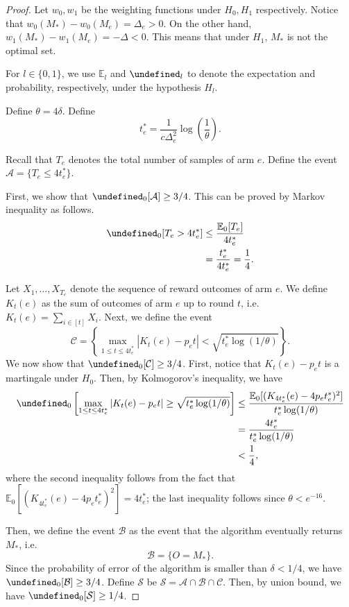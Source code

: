 \documentclass{article}
\newcommand{\E}{\mathbb E}
\let\Pr\undefined
\DeclareMathOperator{\Pr}{Pr}
\begin{document}
\begin{spacing}{1.1}
\begin{proof}
Let $w_0, w_1$ be the weighting functions under $H_0,H_1$ respectively.
Notice that $w_0(M_*)-w_0(M_e)=\Delta_e > 0$.
On the other hand, 
$w_1(M_*)-w_1(M_e) = -\Delta < 0$.
This means that under $H_1$, $M_*$ is not the optimal set.

For $l\in \{0,1\}$, we use $\E_l$ and $\Pr_l$ to denote the expectation and probability, respectively, under the hypothesis $H_l$.

Define $\theta=4\delta$. Define
\begin{equation}
t_e^* = \frac{1}{c\Delta^2_e}\log\left(\frac{1}{\theta}\right).
\label{eq:define-tstar}
\end{equation}

Recall that $T_e$ denotes the total number of samples of arm $e$.
Define the event
$\mathcal A = \{T_e \le 4t_e^* \}$.

First, we show that $\Pr_0[\mathcal A] \ge 3/4$. 
This can be proved by Markov inequality as follows.
\begin{align*}
\Pr_0[T_e > 4t_e^*] &\le \frac{\E_0[T_e]}{4t_e^*} \\
					  &= \frac{t_e^*}{4t_e^*} = \frac14.
\end{align*}

Let $X_1,\ldots,X_{T_e}$ denote the sequence of reward outcomes of arm $e$.
We define $K_t(e)$ as the sum of outcomes of arm $e$ up to round $t$, i.e. $K_t(e) = \sum_{i\in [t]} X_i. $
Next, we define the event 
$$
\mathcal C=\left\{\max_{1\le t \le 4t_e^*} \left|K_t(e)-p_e t\right|  < \sqrt{t_e^*\log(1/\theta)} \right\}.
$$
We now show that $\Pr_0[\mathcal C] \ge 3/4$.
First, notice that $K_t(e)-p_e t$ is a martingale under $H_0$.
Then, by Kolmogorov's inequality, we have
\begin{align*}
\Pr_0\left[\max_{1\le t \le 4t_e^*} \left|K_t(e)-p_e t\right| \ge \sqrt{t_e^*\log(1/\theta)} \right]
&\le \frac{\E_0[ (K_{4t_e^*}(e)-4p_et_e^*)^2]}{t_e^*\log(1/\theta)}\\
&= \frac{4t_e^*}{t_e^*\log(1/\theta)}\\
&< \frac14,
\end{align*}
where the second inequality follows from the fact that $\E_0[(K_{4t_e^*}(e)-4p_et_e^*)^2] = 4t_e^*$; the last inequality follows 
since $\theta < e^{-16}$.

Then, we define the event $\mathcal B$ as the event that the algorithm eventually returns $M_*$, i.e.
$$
\mathcal B=\{O=M_*\}.
$$
Since the probability of error of the algorithm is smaller than $\delta < 1/4$, we have $\Pr_0[\mathcal B] \ge 3/4$.
Define $\mathcal S$ be $\mathcal S=\mathcal A\cap \mathcal B \cap \mathcal C$. 
Then, by union bound, we have $\Pr_0[\mathcal S]\ge 1/4$.


\end{proof}
\end{spacing}
\end{document}
